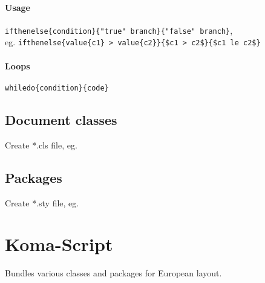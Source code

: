         \paragraph{Usage}{
            \texttt{\bs ifthenelse\{condition\}\{"true" branch\}\{"false" branch\}}, \\
            eg. \texttt{\bs ifthenelse\{\bs value\{c1\} > \bs value\{c2\}\}\{\$c1 > c2\$\}\{\$c1 \bs le c2\$\}}
        }
            
        \paragraph{Loops}{
            \texttt{\bs whiledo\{condition\}\{code\}}
        }
    
    \subsection{Document classes}
        Create *.cls file, eg. \\
    
    \subsection{Packages}
        Create *.sty file, eg. \\

\section{Koma-Script}
    Bundles various classes and packages for European layout.
    
